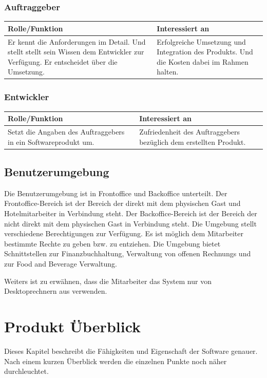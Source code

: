 \documentclass[10pt,a4paper,titlepage]{article}
\begin{document}
\subsubsection{Auftraggeber}
\begin{tabular}[t]{|p{5cm}|p{5cm}|}
    \hline
    \textbf{Rolle\slash{}Funktion} & \textbf{Interessiert an} \\
    \hline
	Er kennt die Anforderungen im Detail. Und stellt stellt sein Wissen dem Entwickler zur Verfügung. Er entscheidet über die Umsetzung. &
	Erfolgreiche Umsetzung und Integration des Produkts. Und die Kosten dabei im Rahmen halten. \\
    \hline
\end{tabular}
\subsubsection{Entwickler}
\begin{tabular}[t]{|p{5cm}|p{5cm}|}
    \hline
    \textbf{Rolle\slash{}Funktion} & \textbf{Interessiert an} \\
    \hline
Setzt die Angaben des Auftraggebers in ein Softwareprodukt um. &
	Zufriedenheit des Auftraggebers bezüglich dem erstellten Produkt.\\
    \hline
\end{tabular}
\subsection{Benutzerumgebung}
Die Benutzerumgebung ist in \Gls{Frontoffice} und \Gls{Backoffice} unterteilt. Der \Gls{Frontoffice}-Bereich ist der Bereich der direkt mit dem physischen \Gls{Gast} und Hotelmitarbeiter in Verbindung steht. Der \Gls{Backoffice}-Bereich ist der Bereich der nicht direkt mit dem physischen \Gls{Gast} in Verbindung steht. Die Umgebung stellt verschiedene Berechtigungen zur Verfügung. Es ist möglich dem \Gls{Mitarbeiter} bestimmte Rechte zu geben bzw. zu entziehen. Die Umgebung bietet Schnittstellen zur Finanzbuchhaltung, Verwaltung von offenen \Glspl{Rechnung} und zur Food and Beverage Verwaltung.

Weiters ist zu erwähnen, dass die \Gls{Mitarbeiter} das System nur von Desktoprechnern aus verwenden.

\newpage

\section{Produkt Überblick}
Dieses Kapitel beschreibt die Fähigkeiten und Eigenschaft der Software genauer. Nach einem kurzen Überblick werden die einzelnen Punkte noch näher durchleuchtet.
\end{document}
